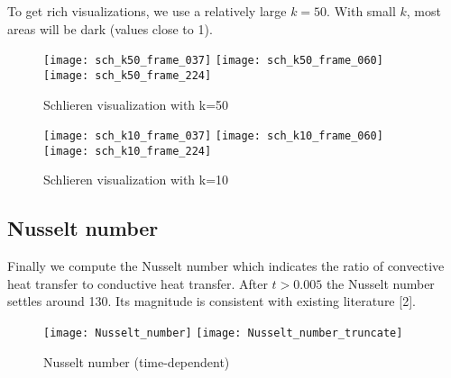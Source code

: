 To get rich visualizations, we use a relatively large $k=50$. With small $k$, most areas will be dark (values close to 1).

\begin{figure}[H]
\texttt{[image: sch\_k50\_frame\_037]}
\texttt{[image: sch\_k50\_frame\_060]}
\texttt{[image: sch\_k50\_frame\_224]}
\centering
\caption{Schlieren visualization with k=50}
\end{figure}

\begin{figure}[H]
\texttt{[image: sch\_k10\_frame\_037]}
\texttt{[image: sch\_k10\_frame\_060]}
\texttt{[image: sch\_k10\_frame\_224]}
\centering
\caption{Schlieren visualization with k=10}
\end{figure}

\subsection{Nusselt number}

Finally we compute the Nusselt number which indicates the ratio of convective heat transfer to conductive heat transfer. After $t > 0.005$ the Nusselt number settles around 130. Its magnitude is consistent with existing literature [2].

\begin{figure}[H]
\texttt{[image: Nusselt\_number]}
\texttt{[image: Nusselt\_number\_truncate]}
\centering
\caption{Nusselt number (time-dependent)}
\end{figure}
